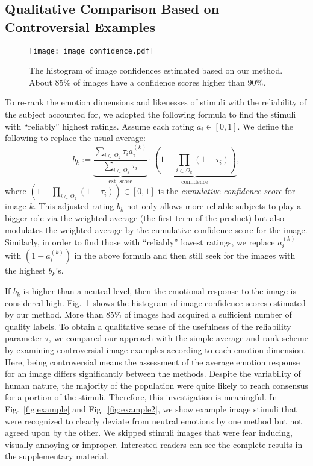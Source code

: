 \documentclass[10pt,journal,letterpaper,compsoc,twoside]{IEEEtran}
\newcommand{\assign}{:=}
\begin{document}
\subsection{Qualitative Comparison Based on Controversial Examples}\label{sec:image_conf}
\begin{figure}
\texttt{[image: image\_confidence.pdf]}
\caption{The histogram of image confidences estimated based on our method.
About 85\% of images have a confidence scores higher than 90\%.}\label{fig:imageconf}
\end{figure}
To re-rank the emotion dimensions and likenesses of stimuli with the reliability of the subject accounted for, we adopted the following formula to 
find the stimuli with ``reliably'' highest ratings.  Assume each rating $a_i\in [0,1]$. We define the following to replace the usual average:
\begin{equation}
b_k \assign \underbrace {\dfrac{\sum_{i\in\Omega_k} \tau_i a_i^{(k)}}{\sum_{i\in\Omega_k} \tau_i} }_\text{est. score}
\cdot \underbrace{\left(1-\prod_{i\in\Omega_k} (1-\tau_i)\right)}_\text{confidence},
\end{equation}
where $\left(1-\prod_{i\in\Omega_k} (1-\tau_i)\right)\in [0,1]$ is the {\em cumulative 
confidence score} for image $k$. This adjusted rating $b_k$ not only allows more reliable subjects to play a bigger role via the weighted average (the first term of the product) but also modulates the weighted average by the cumulative confidence score for the image. 
Similarly, in order to find those with ``reliably'' lowest ratings, we replace $a_i^{(k)}$ with
$(1 - a_i^{(k)})$ in the above formula and then still seek for the images with the highest $b_k$'s. 

If $b_k$ is higher than a neutral level, then the emotional response to the image is considered high. Fig.~\ref{fig:imageconf} shows
the histogram of image confidence scores estimated by our method.
More than 85\% of images had acquired a sufficient number of quality labels. 
To obtain a qualitative sense of the usefulness of the reliability parameter $\tau$, we compared our approach with the simple average-and-rank scheme by examining
controversial image examples according to each emotion dimension.  Here, being controversial means the assessment of the average emotion response for an image differs significantly between the methods.
Despite the variability of human nature, the majority of the population
were quite likely to reach consensus for a portion of the stimuli. Therefore,
this investigation is meaningful. In Fig.~\ref{fig:example} and Fig.~\ref{fig:example2}, we show example image stimuli that were recognized to clearly deviate from neutral emotions by
one method but not agreed upon by the other. We skipped stimuli images that were fear inducing, visually annoying or improper. Interested readers can see the complete results in the supplementary material.
\end{document}
